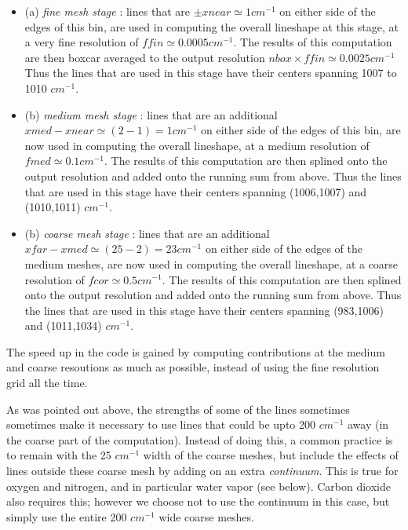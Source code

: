 \documentclass[11pt]{article}
\begin{document}
\begin{itemize}
\item (a) {\it fine mesh stage} : lines that are $\pm xnear \simeq 1cm^{-1}$
          on either side of the edges of this bin, are used in computing 
          the overall lineshape at this stage, at a very fine resolution of 
          $ffin \simeq 0.0005 cm^{-1}$. The results of this computation 
          are then boxcar averaged to the output resolution $nbox \times 
          ffin \simeq 0.0025 cm^{-1}$ \\
          Thus the lines that are used in this stage have their centers 
          spanning 1007 to 1010 $cm^{-1}$.

\item (b) {\it medium mesh stage} : lines that are an additional 
          $xmed - xnear \simeq (2 - 1) = 1 cm^{-1}$ on either side of the 
          edges of this bin, are now used in computing 
          the overall lineshape, at a medium resolution of 
          $fmed \simeq 0.1 cm^{-1}$. The results of this computation 
          are then splined onto the output resolution and added onto the
          running sum from above.
          Thus the lines that are used in this stage have their centers 
          spanning (1006,1007) and (1010,1011) $cm^{-1}$.

\item (b) {\it coarse mesh stage} : lines that are an additional 
          $xfar - xmed \simeq (25 - 2) = 23 cm^{-1}$ on either side of the 
          edges of the medium meshes, are now used in computing 
          the overall lineshape, at a coarse resolution of 
          $fcor \simeq 0.5 cm^{-1}$. The results of this computation 
          are then splined onto the output resolution and added onto the
          running sum from above.
          Thus the lines that are used in this stage have their centers 
          spanning (983,1006) and (1011,1034) $cm^{-1}$.
\end{itemize}

The speed up in the code is gained by computing contributions at the 
medium and coarse resoutions as much as possible, instead of using the 
fine resolution grid all the time.

As was pointed out above, the strengths of some of the lines sometimes
sometimes make it necessary to use lines that could be upto 200 $cm^{-1}$ 
away (in the coarse part of the computation). Instead of doing this, a 
common practice is to remain with the 25 $cm^{-1}$ width of the coarse 
meshes, but include the effects of lines outside these coarse mesh by adding
on an extra {\it continuum}. This is true for oxygen and nitrogen, and in
particular water vapor (see below). Carbon dioxide also requires this; 
however we choose not to use the continuum in this case, but simply use the
entire 200 $cm^{-1}$ wide coarse meshes.
\end{document}
